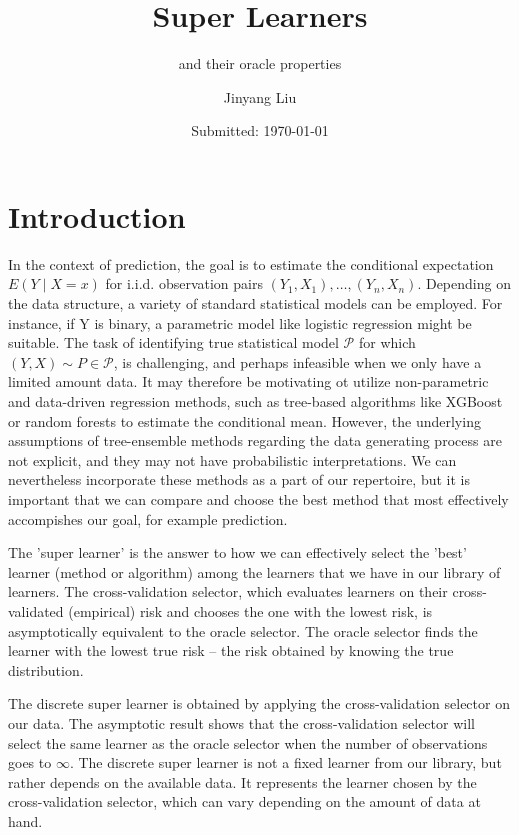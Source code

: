 \documentclass[11pt, a4paper]{article}
\author{Jinyang Liu}
\title{Super Learners}
\subtitle{and their oracle properties}
\date{Submitted: \today}
\theoremstyle{definition}
\theoremstyle{remark}
\begin{document}
\begingroup
    \selectfont
    \maketitle
    \tableofcontents
    \newpage
\endgroup


\section{Introduction}
In the context of prediction, the goal is to estimate the conditional expectation $ E(Y \mid X = x) $ for i.i.d. observation pairs $ (Y_1 , X_1) , \dots , (Y_n , X_n) $. Depending on the data structure, a variety of standard statistical models can be employed. For instance, if Y is binary, a parametric model like logistic regression might be suitable.
The task of identifying true statistical model $ \mathcal{P} $ for which $ (Y, X) \sim P \in \mathcal{P} $, is challenging, and perhaps infeasible when we only have a limited amount data. It may therefore be motivating ot utilize non-parametric and data-driven regression methods, such as tree-based algorithms like XGBoost or random forests to estimate the conditional mean. However, the underlying assumptions of tree-ensemble methods regarding the data generating process are not explicit, and they may not have probabilistic interpretations. We can nevertheless incorporate these methods as a part of our repertoire, but it is important that we can compare and choose the best method that most effectively accompishes our goal, for example prediction. 

The 'super learner' is the answer to how we can effectively select the 'best' learner (method or algorithm) among the learners that we have in our library of learners. The cross-validation selector, which evaluates learners on their cross-validated (empirical) risk and chooses the one with the lowest risk, is asymptotically equivalent to the oracle selector. The oracle selector finds the learner with the lowest true risk -- the risk obtained by knowing the true distribution. 

The discrete super learner is obtained by applying the cross-validation selector on our data. The asymptotic result shows that the cross-validation selector will select the same learner as the oracle selector when the number of observations goes to $ \infty $. The discrete super learner is not a fixed learner from our library, but rather depends on the available data. It represents the learner chosen by the cross-validation selector, which can vary depending on the amount of data at hand.
\end{document}
